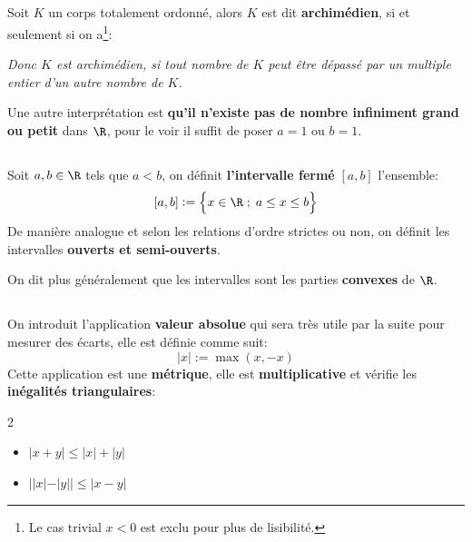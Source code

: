 \subsection*{}
Soit \(K\) un corps totalement ordonné, alors \(K\) est dit \textbf{archimédien}, si et seulement si on a\footnote[3]{Le cas trivial \(x < 0\) est exclu pour plus de lisibilité.}:

\begin{center}
    \textit{
        Donc \(K\) est archimédien, si tout nombre de \(K\) peut être dépassé par un multiple entier\+
        d'un autre nombre de \(K\).
    }
\end{center}

Une autre interprétation est \textbf{qu'il n'existe pas de nombre infiniment grand ou petit} dans \(\R\), pour le voir il suffit de poser \(a = 1\) ou \(b = 1\).
\pagebreak

\subsection*{}
Soit \(a, b \in \R\) tels que \(a < b\), on définit \textbf{l'intervalle fermé} \([a, b]\) l'ensemble:
\[
    [a, b] := \Bigl\{ x\in \R \; ; \; a \leq x \leq b \Bigl\}
\]
De manière analogue et selon les relations d'ordre strictes ou non, on définit les intervalles \textbf{ouverts et semi-ouverts}.\<

On dit plus généralement que les intervalles sont les parties \textbf{convexes} de \(\R\).

\subsection*{}
On introduit l'application \textbf{valeur absolue} qui sera très utile par la suite pour mesurer des écarts, elle est définie comme suit:
\[
    |x| := \max(x, -x)
\]
Cette application est une \textbf{métrique}, elle est \textbf{multiplicative} et vérifie les \textbf{inégalités triangulaires}:
\begin{multicols}{2}
    \begin{itemize}
        \item \(|x + y| \leq |x| + |y|\)
        \item \(||x| - |y|| \leq |x - y|\)
    \end{itemize}
\end{multicols}

